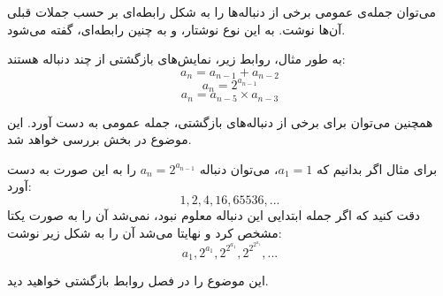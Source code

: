 
\begin{DEFINITION}
    \p
    می‌توان جمله‌ی عمومی برخی از دنباله‌ها را به شکل رابطه‌ای بر حسب جملات قبلی آن‌ها نوشت.
    به این نوع نوشتار،
    و به چنین رابطه‌ای،
    گفته می‌شود.
\end{DEFINITION}

\p
به طور مثال، روابط زیر، نمایش‌های بازگشتی از چند دنباله هستند:
$$a_n=a_{n-1}+a_{n-2}$$
$$a_n=2^{a_{n-1}}$$
$$a_n=a_{n-5}\times a_{n-3}$$

\p
همچنین می‌توان برای برخی از دنباله‌های بازگشتی، جمله عمومی به دست آورد. این موضوع در بخش  بررسی خواهد شد.

\p
برای مثال اگر بدانیم که 
$a_1=1$،
می‌توان دنباله
$a_n=2^{a_{n-1}}$
را به این صورت به دست آورد:
\[1,2,4,16,65536,...\]
دقت کنید که اگر جمله ابتدایی این دنباله معلوم نبود، نمی‌شد آن را به صورت یکتا مشخص کرد و نهایتا می‌شد آن را به شکل زیر نوشت:
\[a_1,2^{a_1},2^{2^{a_1}},2^{2^{2^{a_1}}},...\]




 این موضوع را در فصل روابط بازگشتی خواهید دید.







